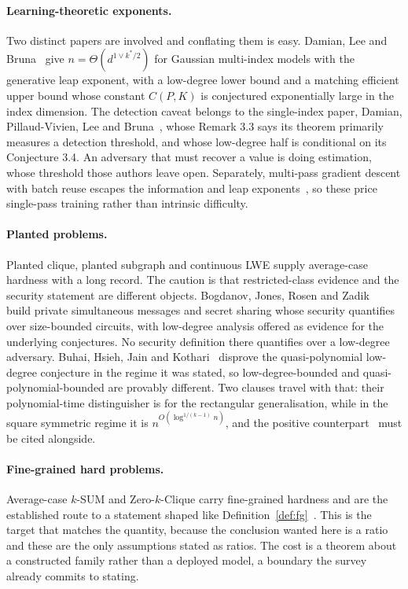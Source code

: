 \documentclass[11pt]{article}
\theoremstyle{definition}
\theoremstyle{plain}
\begin{document}
\paragraph{Learning-theoretic exponents.} Two distinct papers are involved and
conflating them is easy. Damian, Lee and Bruna~\cite{DLB25} give
$n = \Theta(d^{1 \vee k^*/2})$ for Gaussian multi-index models with the generative
leap exponent, with a low-degree lower bound and a matching efficient upper bound
whose constant $C(P,K)$ is conjectured exponentially large in the index dimension.
The detection caveat belongs to the single-index paper, Damian, Pillaud-Vivien, Lee
and Bruna~\cite{DPLB24}, whose Remark 3.3 says its theorem primarily measures a
detection threshold, and whose low-degree half is conditional on its Conjecture
3.4. An adversary that must recover a value is doing estimation, whose threshold
those authors leave open. Separately, multi-pass gradient descent with batch reuse
escapes the information and leap exponents~\cite{DTAPZK24}, so these price
single-pass training rather than intrinsic difficulty.

\paragraph{Planted problems.} Planted clique, planted subgraph and continuous LWE
supply average-case hardness with a long record. The caution is that restricted-class
evidence and the security statement are different objects. Bogdanov, Jones, Rosen
and Zadik~\cite{BJRZ24} build private simultaneous messages and secret sharing whose
security quantifies over size-bounded circuits, with low-degree analysis offered as
evidence for the underlying conjectures. No security definition there quantifies
over a low-degree adversary. Buhai, Hsieh, Jain and Kothari~\cite{BHJK25} disprove
the quasi-polynomial low-degree conjecture in the regime it was stated, so
low-degree-bounded and quasi-polynomial-bounded are provably different. Two clauses
travel with that: their polynomial-time distinguisher is for the rectangular
generalisation, while in the square symmetric regime it is
$n^{O(\log^{1/(k-1)} n)}$, and the positive counterpart~\cite{HKKLMT26} must be
cited alongside.

\paragraph{Fine-grained hard problems.} Average-case $k$-SUM and Zero-$k$-Clique
carry fine-grained hardness and are the established route to a statement shaped
like Definition~\ref{def:fg}~\cite{LLW19,BRSV17}. This is the target that matches
the quantity, because the conclusion wanted here is a ratio and these are the only
assumptions stated as ratios. The cost is a theorem about a constructed family
rather than a deployed model, a boundary the survey already commits to stating.
\end{document}
